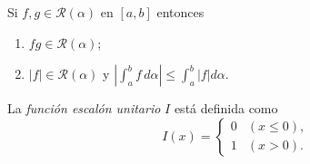 \documentclass[11pt]{beamer}
\begin{document}
\begin{frame}

\begin{theorem}[9]
Si $f, g \in \mathcal{R}(\alpha)$ en $[a, b]$ entonces
\begin{enumerate}
	\item $fg \in \mathcal{R}(\alpha)$;
	\item $|f| \in \mathcal{R}(\alpha)$ y $|\int_a^b f\,d\alpha| \leq \int_a^b |f| d\alpha$.
\end{enumerate}
\end{theorem}

\begin{definition}
La \textit{función escalón unitario} $I$ está definida como
\[
	I(x) = \begin{cases}
		0 & (x \leq 0),\\
		1 & (x > 0).
	\end{cases}
\]
\end{definition}

\end{frame}
\end{document}
